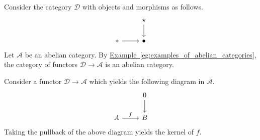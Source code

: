 \documentclass[main.tex]{subfiles}
\begin{document}
\begin{example}
  Consider the category $\mathcal{D}$ with objects and morphisms as follows.
  \begin{equation*}
    \begin{tikzcd}
      & \star
      \arrow[d]
      \\
      *
      \arrow[r]
      & \bullet
    \end{tikzcd}
  \end{equation*}
  Let $\mathcal{A}$ be an abelian category. By \hyperref[eg:examples_of_abelian_categories]{Example~\ref*{eg:examples_of_abelian_categories}}, the category of functors $\mathcal{D} \to \mathcal{A}$ is an abelian category.

  Consider a functor $\mathcal{D} \to \mathcal{A}$ which yields the following diagram in $\mathcal{A}$.
  \begin{equation*}
    \begin{tikzcd}
      & 0
      \arrow[d]
      \\
      A
      \arrow[r, "f"]
      & B
    \end{tikzcd}
  \end{equation*}
  Taking the pullback of the above diagram yields the kernel of $f$.


\end{example}
\end{document}

